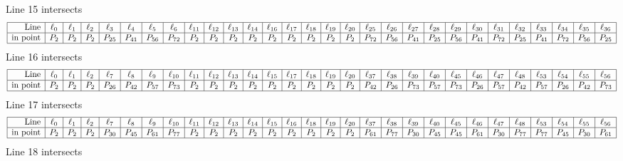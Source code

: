 \documentclass{article}
\begin{document}
{$$$$
Line 15 intersects 
$$
\begin{array}{|r*{28}{|c}|}
\hline
\mbox{Line}  & \ell_{0} & \ell_{1} & \ell_{2} & \ell_{3} & \ell_{4} & \ell_{5} & \ell_{6} & \ell_{11} & \ell_{12} & \ell_{13} & \ell_{14} & \ell_{16} & \ell_{17} & \ell_{18} & \ell_{19} & \ell_{20} & \ell_{25} & \ell_{26} & \ell_{27} & \ell_{28} & \ell_{29} & \ell_{30} & \ell_{31} & \ell_{32} & \ell_{33} & \ell_{34} & \ell_{35} & \ell_{36}\\
\hline
\mbox{in point}  & P_{2} & P_{2} & P_{2} & P_{25} & P_{41} & P_{56} & P_{72} & P_{2} & P_{2} & P_{2} & P_{2} & P_{2} & P_{2} & P_{2} & P_{2} & P_{2} & P_{72} & P_{56} & P_{41} & P_{25} & P_{56} & P_{41} & P_{72} & P_{25} & P_{41} & P_{72} & P_{56} & P_{25}\\
\hline
\end{array}
$$
Line 16 intersects 
$$
\begin{array}{|r*{28}{|c}|}
\hline
\mbox{Line}  & \ell_{0} & \ell_{1} & \ell_{2} & \ell_{7} & \ell_{8} & \ell_{9} & \ell_{10} & \ell_{11} & \ell_{12} & \ell_{13} & \ell_{14} & \ell_{15} & \ell_{17} & \ell_{18} & \ell_{19} & \ell_{20} & \ell_{37} & \ell_{38} & \ell_{39} & \ell_{40} & \ell_{45} & \ell_{46} & \ell_{47} & \ell_{48} & \ell_{53} & \ell_{54} & \ell_{55} & \ell_{56}\\
\hline
\mbox{in point}  & P_{2} & P_{2} & P_{2} & P_{26} & P_{42} & P_{57} & P_{73} & P_{2} & P_{2} & P_{2} & P_{2} & P_{2} & P_{2} & P_{2} & P_{2} & P_{2} & P_{42} & P_{26} & P_{73} & P_{57} & P_{73} & P_{26} & P_{57} & P_{42} & P_{57} & P_{26} & P_{42} & P_{73}\\
\hline
\end{array}
$$
Line 17 intersects 
$$
\begin{array}{|r*{28}{|c}|}
\hline
\mbox{Line}  & \ell_{0} & \ell_{1} & \ell_{2} & \ell_{7} & \ell_{8} & \ell_{9} & \ell_{10} & \ell_{11} & \ell_{12} & \ell_{13} & \ell_{14} & \ell_{15} & \ell_{16} & \ell_{18} & \ell_{19} & \ell_{20} & \ell_{37} & \ell_{38} & \ell_{39} & \ell_{40} & \ell_{45} & \ell_{46} & \ell_{47} & \ell_{48} & \ell_{53} & \ell_{54} & \ell_{55} & \ell_{56}\\
\hline
\mbox{in point}  & P_{2} & P_{2} & P_{2} & P_{30} & P_{45} & P_{61} & P_{77} & P_{2} & P_{2} & P_{2} & P_{2} & P_{2} & P_{2} & P_{2} & P_{2} & P_{2} & P_{61} & P_{77} & P_{30} & P_{45} & P_{45} & P_{61} & P_{30} & P_{77} & P_{77} & P_{45} & P_{30} & P_{61}\\
\hline
\end{array}
$$
Line 18 intersects 
$$
\begin{array}{|r*{28}{|c}|}

\end{array}$$}
\end{document}
